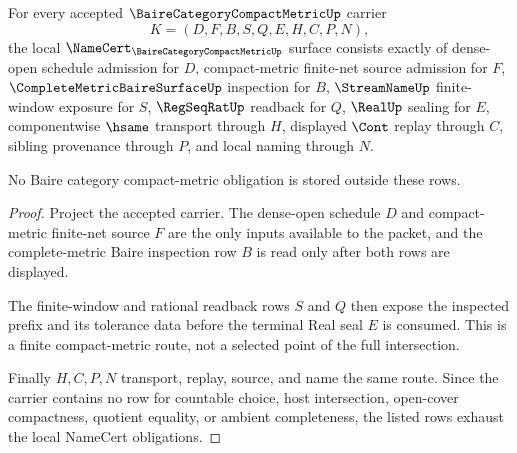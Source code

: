 \begin{theorem}
\label{thm:baire-category-compact-metric-namecert-obligations}
For every accepted $\BaireCategoryCompactMetricUp$ carrier
$$
K=(D,F,B,S,Q,E,H,C,P,N),
$$
the local $\NameCert_{\BaireCategoryCompactMetricUp}$ surface consists exactly of dense-open schedule admission for $D$, compact-metric finite-net source admission for $F$, $\CompleteMetricBaireSurfaceUp$ inspection for $B$, $\StreamNameUp$ finite-window exposure for $S$, $\RegSeqRatUp$ readback for $Q$, $\RealUp$ sealing for $E$, componentwise $\hsame$ transport through $H$, displayed $\Cont$ replay through $C$, sibling provenance through $P$, and local naming through $N$.

No Baire category compact-metric obligation is stored outside these rows.
\end{theorem}
\begin{proof}
Project the accepted carrier. The dense-open schedule $D$ and compact-metric finite-net source $F$ are the only inputs available to the packet, and the complete-metric Baire inspection row $B$ is read only after both rows are displayed.

The finite-window and rational readback rows $S$ and $Q$ then expose the inspected prefix and its tolerance data before the terminal Real seal $E$ is consumed. This is a finite compact-metric route, not a selected point of the full intersection.

Finally $H,C,P,N$ transport, replay, source, and name the same route. Since the carrier contains no row for countable choice, host intersection, open-cover compactness, quotient equality, or ambient completeness, the listed rows exhaust the local NameCert obligations.
\end{proof}

